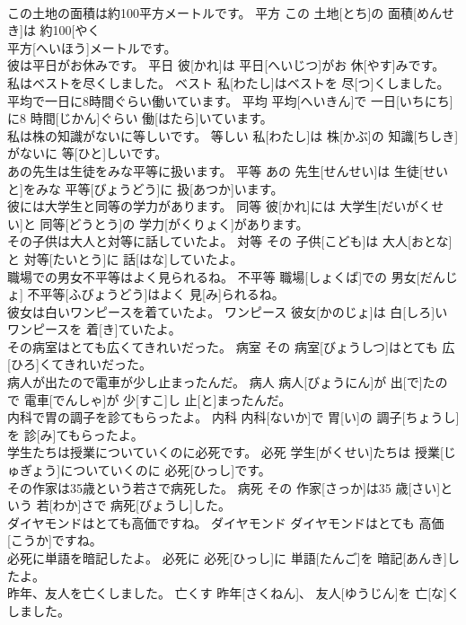 \documentclass[8pt]{extreport}
\begin{document}
\begin{CJK}{UTF8}{min}
\\	この土地の面積は約100平方メートルです。	平方	この 土地[とち]の 面積[めんせき]は 約100[やく 
\\	平方[へいほう]メートルです。	
\\	彼は平日がお休みです。	平日	彼[かれ]は 平日[へいじつ]がお 休[やす]みです。	
\\	私はベストを尽くしました。	ベスト	私[わたし]はベストを 尽[つ]くしました。	
\\	平均で一日に8時間ぐらい働いています。	平均	平均[へいきん]で 一日[いちにち]に8 時間[じかん]ぐらい 働[はたら]いています。	
\\	私は株の知識がないに等しいです。	等しい	私[わたし]は 株[かぶ]の 知識[ちしき]がないに 等[ひと]しいです。	
\\	あの先生は生徒をみな平等に扱います。	平等	あの 先生[せんせい]は 生徒[せいと]をみな 平等[びょうどう]に 扱[あつか]います。	
\\	彼には大学生と同等の学力があります。	同等	彼[かれ]には 大学生[だいがくせい]と 同等[どうとう]の 学力[がくりょく]があります。	
\\	その子供は大人と対等に話していたよ。	対等	その 子供[こども]は 大人[おとな]と 対等[たいとう]に 話[はな]していたよ。	
\\	職場での男女不平等はよく見られるね。	不平等	職場[しょくば]での 男女[だんじょ] 不平等[ふびょうどう]はよく 見[み]られるね。	
\\	彼女は白いワンピースを着ていたよ。	ワンピース	彼女[かのじょ]は 白[しろ]いワンピースを 着[き]ていたよ。	
\\	その病室はとても広くてきれいだった。	病室	その 病室[びょうしつ]はとても 広[ひろ]くてきれいだった。	
\\	病人が出たので電車が少し止まったんだ。	病人	病人[びょうにん]が 出[で]たので 電車[でんしゃ]が 少[すこ]し 止[と]まったんだ。	
\\	内科で胃の調子を診てもらったよ。	内科	内科[ないか]で 胃[い]の 調子[ちょうし]を 診[み]てもらったよ。	
\\	学生たちは授業についていくのに必死です。	必死	学生[がくせい]たちは 授業[じゅぎょう]についていくのに 必死[ひっし]です。	
\\	その作家は35歳という若さで病死した。	病死	その 作家[さっか]は35 歳[さい]という 若[わか]さで 病死[びょうし]した。	
\\	ダイヤモンドはとても高価ですね。	ダイヤモンド	ダイヤモンドはとても 高価[こうか]ですね。	
\\	必死に単語を暗記したよ。	必死に	必死[ひっし]に 単語[たんご]を 暗記[あんき]したよ。	
\\	昨年、友人を亡くしました。	亡くす	昨年[さくねん]、 友人[ゆうじん]を 亡[な]くしました。	

\end{CJK}
\end{document}
